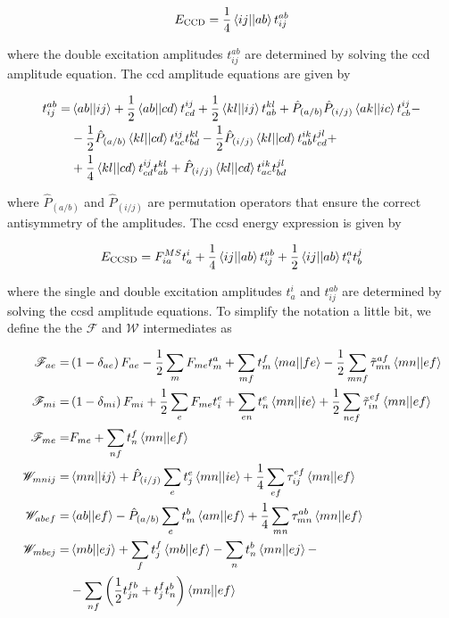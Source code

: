 \begin{equation}
E_{\text{CCD}}=\frac{1}{4}\braket{ij||ab}t_{ij}^{ab}
\end{equation}

where the double excitation amplitudes \(t_{ij}^{ab}\) are determined by solving the \acrshort{ccd} amplitude equation. The \acrshort{ccd} amplitude equations are given by

\begin{align}
t_{ij}^{ab}=&\braket{ab||ij}+\frac{1}{2}\braket{ab||cd}t_{cd}^{ij}+\frac{1}{2}\braket{kl||ij}t_{ab}^{kl}+\hat{P}_{(a/b)}\hat{P}_{(i/j)}\braket{ak||ic}t_{cb}^{ij}-\nonumber \\
&-\frac{1}{2}\hat{P}_{(a/b)}\braket{kl||cd}t_{ac}^{ij}t_{bd}^{kl}-\frac{1}{2}\hat{P}_{(i/j)}\braket{kl||cd}t_{ab}^{ik}t_{cd}^{jl}+\nonumber \\
&+\frac{1}{4}\braket{kl||cd}t_{cd}^{ij}t_{ab}^{kl}+\hat{P}_{(i/j)}\braket{kl||cd}t_{ac}^{ik}t_{bd}^{jl}
\end{align}

where \(\hat{P}_{(a/b)}\) and \(\hat{P}_{(i/j)}\) are permutation operators that ensure the correct antisymmetry of the amplitudes. The \acrshort{ccsd} energy expression is given by

\begin{equation}
E_{\text{CCSD}}=F_{ia}^{MS}t_a^i+\frac{1}{4}\braket{ij||ab}t_{ij}^{ab}+\frac{1}{2}\braket{ij||ab}t_{i}^{a}t_{b}^{j}
\end{equation}

where the single and double excitation amplitudes \(t_a^i\) and \(t_{ij}^{ab}\) are determined by solving the \acrshort{ccsd} amplitude equations. To simplify the notation a little bit, we define the the \(\mathscr{F}\) and \(\mathscr{W}\) intermediates as

\begin{align}
\mathscr{F}_{ae}=&\left(1-\delta_{ae}\right)F_{ae}-\frac{1}{2}\sum_mF_{me}t_m^a+\sum_{mf}t_m^f\braket{ma||fe}-\frac{1}{2}\sum_{mnf}\tilde{\tau}_{mn}^{af}\braket{mn||ef} \\
\mathscr{F}_{mi}=&\left(1-\delta_{mi}\right)F_{mi}+\frac{1}{2}\sum_eF_{me}t_i^e+\sum_{en}t_n^e\braket{mn||ie}+\frac{1}{2}\sum_{nef}\tilde{\tau}_{in}^{ef}\braket{mn||ef} \\
\mathscr{F}_{me}=&F_{me}+\sum_{nf}t_n^f\braket{mn||ef} \\
\mathscr{W}_{mnij}=&\braket{mn||ij}+\hat{P}_{(i/j)}\sum_et_j^e\braket{mn||ie}+\frac{1}{4}\sum_{ef}\tau_{ij}^{ef}\braket{mn||ef} \\
\mathscr{W}_{abef}=&\braket{ab||ef}-\hat{P}_{(a/b)}\sum_et_m^b\braket{am||ef}+\frac{1}{4}\sum_{mn}\tau_{mn}^{ab}\braket{mn||ef} \\
\mathscr{W}_{mbej}=&\braket{mb||ej}+\sum_ft_j^f\braket{mb||ef}-\sum_nt_n^b\braket{mn||ej}- \\
&-\sum_{nf}\left(\frac{1}{2}t_{jn}^{fb}+t_j^ft_n^b\right)\braket{mn||ef}
\end{align}

